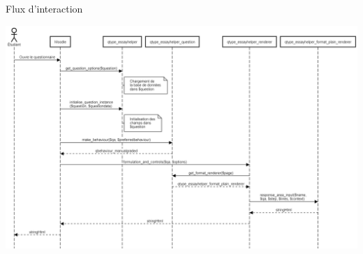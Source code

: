 \documentclass{beamer}
\begin{document}
  \begin{frame}
  \frametitle{\insertsection}
  \alert{Flux d'interaction}
\vfill
    \begin{center}
    \includegraphics[scale=0.2]{../images/diagramme-flux.png}
    \end{center}
  \end{frame}
  
\end{document}
